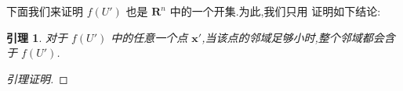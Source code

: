 \documentclass[twoside,11pt]{article}
\newtheorem{lemma}{引理}
\begin{document}
下面我们来证明 $f(U')$ 也是 $\mathbf{R}^n$ 中的一个开集.为此,我们只用
证明如下结论:

\begin{lemma}
对于 $f(U')$ 中的任意一个点 $\mathbf{x'}$,当该点的邻域足够小时,整个邻域都会含于 $f(U')$.  
\end{lemma}
\begin{proof}[引理证明]
 
\end{proof}

%

\end{document}
